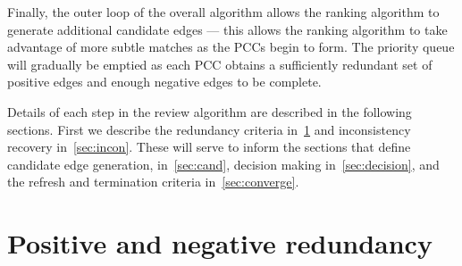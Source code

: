Finally, the outer loop of the overall algorithm allows the ranking algorithm to generate additional candidate
  edges --- this allows the ranking algorithm to take advantage of more subtle matches as the PCCs begin to form.
The priority queue will gradually be emptied as each PCC obtains a sufficiently redundant set of positive edges
  and enough negative edges to be complete.

Details of each step in the review algorithm are described in the following sections.
First we describe the redundancy criteria in~\cref{sec:redun} and inconsistency recovery in~\cref{sec:incon}.
These will serve to inform the sections that define candidate edge generation, in~\cref{sec:cand}, decision
  making in~\cref{sec:decision}, and the refresh and termination criteria in~\cref{sec:converge}.


\section{Positive and negative redundancy}\label{sec:redun}

